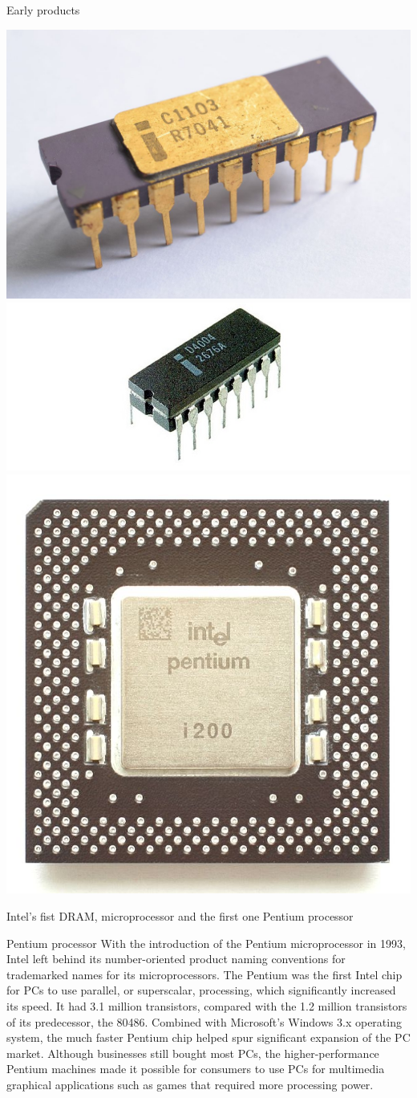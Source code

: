 \documentclass{beamer}
\begin{document}
\begin{frame}{Early products}
\begin{center}
\includegraphics[width=.3\linewidth, height = 3 cm]{img/dram.jpg}\quad\includegraphics[width=.3\linewidth, height = 3 cm]{img/cpu.jpg}\quad\includegraphics[width=.3\linewidth, height = 3 cm]{img/pentium.jpg} 
\\[\baselineskip]
\end{center}
Intel's fist DRAM, microprocessor and the first one Pentium processor 
\end{frame}

\begin{frame}
\begin{block}{Pentium processor}
With the introduction of the Pentium microprocessor in 1993, Intel left behind its number-oriented product naming conventions for trademarked names for its microprocessors. The Pentium was the first Intel chip for PCs to use parallel, or superscalar, processing, which significantly increased its speed. It had 3.1 million transistors, compared with the 1.2 million transistors of its predecessor, the 80486. Combined with Microsoft’s Windows 3.x operating system, the much faster Pentium chip helped spur significant expansion of the PC market. Although businesses still bought most PCs, the higher-performance Pentium machines made it possible for consumers to use PCs for multimedia graphical applications such as games that required more processing power. 
\end{block}
\end{frame}
\end{document}
